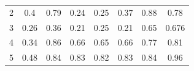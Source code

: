 \documentclass[twoside,11pt]{article}
\begin{document}
\begin{table}[H]
{\begin{tabular}{cccccccc}
\multicolumn{1}{|c|}{2}     & \multicolumn{1}{c|}{0.4}                                                            & \multicolumn{1}{c|}{\cellcolor[HTML]{ECF4FF}0.79}                                                             & \multicolumn{1}{c|}{0.24}                                                                               & \multicolumn{1}{c|}{0.25}                                                                               & \multicolumn{1}{c|}{0.37}                                                                               & \multicolumn{1}{c|}{\cellcolor[HTML]{FFCCC9}0.88}                                                          & \multicolumn{1}{c|}{\cellcolor[HTML]{FFFFFF}0.78}                                                          \\ \cline{1-1}
\multicolumn{1}{|c|}{3}     & \multicolumn{1}{c|}{0.26}                                                           & \multicolumn{1}{c|}{0.36}                                                                                     & \multicolumn{1}{c|}{0.21}                                                                               & \multicolumn{1}{c|}{0.25}                                                                               & \multicolumn{1}{c|}{0.21}                                                                               & \multicolumn{1}{c|}{\cellcolor[HTML]{ECF4FF}0.65}                                                          & \multicolumn{1}{c|}{\cellcolor[HTML]{FFCCC9}0.676}                                                         \\ \cline{1-1}
\multicolumn{1}{|c|}{4}     & \multicolumn{1}{c|}{0.34}                                                           & \multicolumn{1}{c|}{\cellcolor[HTML]{FFCCC9}0.86}                                                             & \multicolumn{1}{c|}{0.66}                                                                               & \multicolumn{1}{c|}{0.65}                                                                               & \multicolumn{1}{c|}{0.66}                                                                               & \multicolumn{1}{c|}{0.77}                                                                                  & \multicolumn{1}{c|}{\cellcolor[HTML]{ECF4FF}0.81}                                                          \\ \cline{1-1}
\multicolumn{1}{|c|}{5}     & \multicolumn{1}{c|}{0.48}                                                           & \multicolumn{1}{c|}{\cellcolor[HTML]{ECF4FF}0.84}                                                             & \multicolumn{1}{c|}{0.83}                                                                               & \multicolumn{1}{c|}{0.82}                                                                               & \multicolumn{1}{c|}{0.83}                                                                               & \multicolumn{1}{c|}{\cellcolor[HTML]{ECF4FF}0.84}                                                          & \multicolumn{1}{c|}{\cellcolor[HTML]{FFCCC9}0.96}                                                          \\ \cline{1-1}

\end{tabular}}
\end{table}
\end{document}
